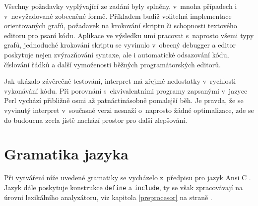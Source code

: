 \documentclass[11pt,twoside,a4paper]{book}
\begin{document}
Všechny požadavky vyplývající ze zadání byly splněny, v~mnoha případech i v~nevyžadované zobecněné formě. Příkladem budiž volitelná implementace orientovaných grafů, požadavek na krokování skriptu či schopnosti textového editoru pro psaní kódu. Aplikace ve výsledku umí pracovat s~naprosto všemi typy grafů, jednoduché krokování skriptu se vyvinulo v~obecný debugger a editor poskytuje nejen zvýrazňování syntaxe, ale i automatické odsazování kódu, číslování řádků a další vymoženosti běžných programátorských editorů.

Jak ukázalo závěrečné testování, interpret má zřejmé nedostatky v~rychlosti vykonávání kódu. Při porovnání s~ekvivalentními programy zapsanými v~jazyce Perl vychází přibližně osmi až patnáctinásobně pomalejší běh. Je pravda, že se vyvinutý interpret v~současné verzi nesnaží o~naprosto žádné optimalizace, zde se do budoucna zcela jistě nachází prostor pro další zlepšování.





{
\def\CS{$\cal C\kern-0.1667em\lower.5ex\hbox{$\cal S$}\kern-0.075em $}

}



\appendix


\chapter{Gramatika jazyka}
\label{gramatika_jazyka}

Při vytváření níže uvedené gramatiky se vycházelo z~předpisu pro jazyk Ansi C \cite{c_grammar}. Jazyk dále poskytuje konstrukce \texttt{define} a \texttt{include}, ty se však zpracovávají na úrovni lexikálního analyzátoru, viz kapitola \ref{preprocesor} na straně \pageref{preprocesor}.
\end{document}
